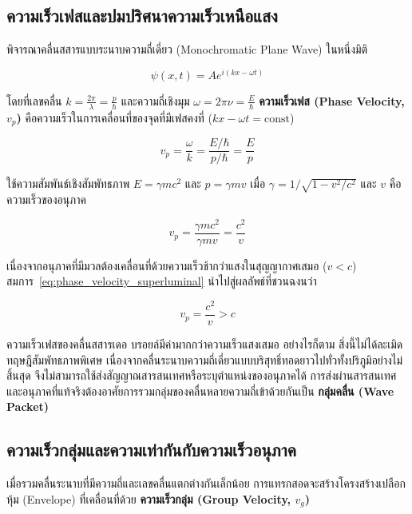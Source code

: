 \subsection{ความเร็วเฟสและปมปริศนาความเร็วเหนือแสง}

พิจารณาคลื่นสสารแบบระนาบความถี่เดี่ยว (Monochromatic Plane Wave) ในหนึ่งมิติ

\begin{equation}
\psi(x, t) = A e^{i(k x - \omega t)}
\label{eq:plane_matter_wave}
\end{equation}

โดยที่เลขคลื่น $k = \frac{2\pi}{\lambda} = \frac{p}{\hbar}$ และความถี่เชิงมุม $\omega = 2\pi\nu = \frac{E}{\hbar}$ \textbf{ความเร็วเฟส (Phase Velocity, $v_p$)} คือความเร็วในการเคลื่อนที่ของจุดที่มีเฟสคงที่ ($kx - \omega t = \text{const}$)

\begin{equation}
v_p = \frac{\omega}{k} = \frac{E/\hbar}{p/\hbar} = \frac{E}{p}
\label{eq:phase_velocity_def}
\end{equation}

ใช้ความสัมพันธ์เชิงสัมพัทธภาพ $E = \gamma m c^2$ และ $p = \gamma m v$ เมื่อ $\gamma = 1/\sqrt{1 - v^2/c^2}$ และ $v$ คือความเร็วของอนุภาค

\begin{equation}
v_p = \frac{\gamma m c^2}{\gamma m v} = \frac{c^2}{v}
\label{eq:phase_velocity_superluminal}
\end{equation}

เนื่องจากอนุภาคที่มีมวลต้องเคลื่อนที่ด้วยความเร็วช้ากว่าแสงในสุญญากาศเสมอ ($v < c$) สมการ~\eqref{eq:phase_velocity_superluminal} นำไปสู่ผลลัพธ์ที่ชวนฉงนว่า

\begin{equation}
v_p = \frac{c^2}{v} > c
\end{equation}

ความเร็วเฟสของคลื่นสสารเดอ บรอยล์มีค่ามากกว่าความเร็วแสงเสมอ อย่างไรก็ตาม สิ่งนี้ไม่ได้ละเมิดทฤษฎีสัมพัทธภาพพิเศษ เนื่องจากคลื่นระนาบความถี่เดี่ยวแบบบริสุทธิ์ทอดยาวไปทั่วทั้งปริภูมิอย่างไม่สิ้นสุด จึงไม่สามารถใช้ส่งสัญญาณสารสนเทศหรือระบุตำแหน่งของอนุภาคได้ การส่งผ่านสารสนเทศและอนุภาคที่แท้จริงต้องอาศัยการรวมกลุ่มของคลื่นหลายความถี่เข้าด้วยกันเป็น \textbf{กลุ่มคลื่น (Wave Packet)}

\subsection{ความเร็วกลุ่มและความเท่ากันกับความเร็วอนุภาค}

เมื่อรวมคลื่นระนาบที่มีความถี่และเลขคลื่นแตกต่างกันเล็กน้อย การแทรกสอดจะสร้างโครงสร้างเปลือกหุ้ม (Envelope) ที่เคลื่อนที่ด้วย \textbf{ความเร็วกลุ่ม (Group Velocity, $v_g$)}

